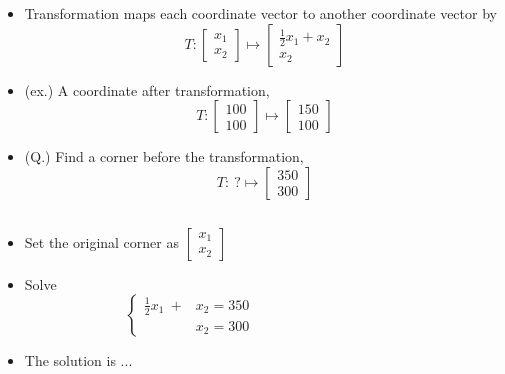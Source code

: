 \documentclass{beamer}
\theoremstyle{definition}
\theoremstyle{theorem}
\begin{document}
\begin{frame}
 
\begin{itemize}
 \item Transformation maps each coordinate vector to another coordinate vector by 
 $$ T:
\begin{bmatrix}
 x_{1}\\x_{2}
\end{bmatrix}
\mapsto 
\begin{bmatrix}
 \frac 1 2 x_{1} + x_{2}
 \\x_{2}
\end{bmatrix}
$$

\item (ex.) A coordinate after transformation,
 $$ T:
\begin{bmatrix}
 100\\100
\end{bmatrix}
\mapsto 
\begin{bmatrix}
 150\\100
\end{bmatrix}
$$
\item (Q.) 
Find a corner before the transformation,
 $$ T:
\ ?
\mapsto 
\begin{bmatrix}
 350\\300
\end{bmatrix}
$$
\end{itemize}
\end{frame}



 \begin{frame}%
\begin{columns}
    \begin{column}{0.5\textwidth}
        
\begin{itemize}
 \item Set the original corner as 
 $\begin{bmatrix}
 x_{1}\\x_{2}
\end{bmatrix}$
\item Solve
\begin{equation*}
 \label{eq:01}
\left\{
\begin{array}
 {ll}
\frac 1 2 x_{1}  \ + & x_{2} = 350 \\
& x_{2} = 300
\end{array}
\right.
\end{equation*}
 \item The solution is ...
\end{itemize}   
\end{column}
    \begin{column}{0.5\textwidth}
    \end{column}
\end{columns}
\end{frame}
\end{document}

